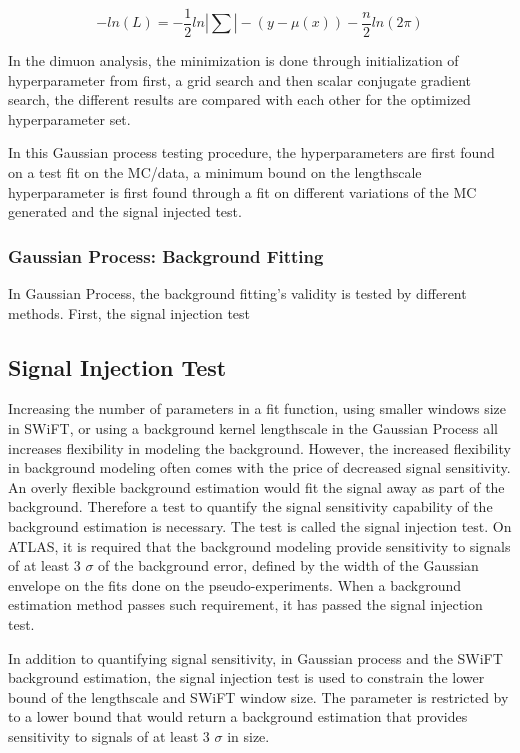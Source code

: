     \begin{equation}
        -ln(L) = -\frac{1}{2} ln |\sum| - (y-\mu(x) ) - \frac{n}{2}ln(2\pi)
    \label{eq:loglikelihood}
    \end{equation}
    
    In the dimuon analysis, the minimization is done through initialization of hyperparameter from first, a grid search and then scalar conjugate gradient search, the different results are compared with each other for the optimized hyperparameter set.

    In this Gaussian process testing procedure, the hyperparameters are first found on a test fit on the MC/data, a minimum bound on the lengthscale hyperparameter is first found through a fit on different variations of the MC generated and the signal injected test.
%
\subsubsection{Gaussian Process: Background Fitting}
In Gaussian Process, the background fitting's validity is tested by different methods. First, the signal injection test 

\subsection{Signal Injection Test}
\label{sec:signalInjection}
    Increasing the number of parameters in a fit function, using smaller windows size in SWiFT, or using a background kernel lengthscale in the Gaussian Process all increases flexibility in modeling the background. However, the increased flexibility in background modeling often comes with the price of decreased signal sensitivity. An overly flexible background estimation would fit the signal away as part of the background. 
    Therefore a test to quantify the signal sensitivity capability of the background estimation is necessary. The test is called the signal injection test. On ATLAS, it is required that the background modeling provide sensitivity to signals of at least 3 $\sigma$ of the background error, defined by the width of the Gaussian envelope on the fits done on the pseudo-experiments. When a background estimation method passes such requirement, it has passed the signal injection test.

    In addition to quantifying signal sensitivity, in Gaussian process and the SWiFT background estimation, the signal injection test is used to constrain the lower bound of the lengthscale and SWiFT window size.
    The parameter is restricted by to a lower bound that would return a background estimation that provides sensitivity to signals of at least 3 $\sigma$ in size.

